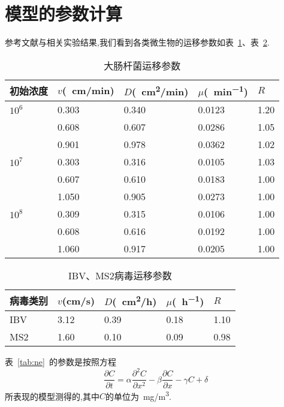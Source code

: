 \section{模型的参数计算}
参考文献与相关实验结果,我们看到各类微生物的运移参数如表~\ref{tab:dachangganjun}、表~\ref{tab:ibv}.
\begin{table}[t]
\caption{大肠杆菌运移参数\label{tab:dachangganjun}}
\begin{tabularx}{\textwidth}{XXXXX}
\toprule
初始浓度 & $v$(\SI{}{cm/min}) & $D$(\SI{}{cm^2/min}) & $\mu$(\SI{}{min^{-1}}) & $R$\\
\midrule
$10^6$	&	0.303	&	0.340	&	0.0123	&	1.20 \\
		&	0.608	&	0.607	&	0.0286	&	1.05 \\
		&	0.901	&	0.978	&	0.0362	&	1.02 \\
$10^7$	&	0.303	&	0.316	&	0.0105	&	1.03 \\
		&	0.607	&	0.610	&	0.0183	&	1.00 \\
		&	1.050	&	0.905	&	0.0273	&	1.00 \\
$10^8$	&	0.309	&	0.315	&	0.0106	&	1.00 \\
		&	0.608	&	0.616	&	0.0192	&	1.00 \\
		&	1.060	&	0.917	&	0.0205	&	1.00 \\
\bottomrule
\end{tabularx}
\end{table}
\par
\begin{table}[t]
\centering
\caption{\label{tab:ibv}IBV、MS2病毒运移参数}
\begin{tabularx}{\textwidth}{XXXXX}
\toprule
病毒类别 & $v$(cm/s) & $D$(\SI{}{cm^2/h}) & $\mu$(\SI{}{h^{-1}}) & $R$\\
\midrule
IBV		& 3.12	& 0.39	&	0.18	&	1.10	\\
MS2		& 1.60	& 0.10	&	0.09	&	0.98	\\
\bottomrule
\end{tabularx}
\end{table}
\par
表~\ref{tab:ne}~的参数是按照方程
\begin{equation}
	\dfrac{\partial C}{\partial t}= \alpha\dfrac{\partial^2 C}{\partial x^2}-\beta\dfrac{\partial C}{\partial x}-\gamma C + \delta
\end{equation}
所表现的模型测得的,其中$C$的单位为\SI{}{mg/m^3}.\par
